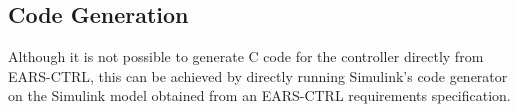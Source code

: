 \subsection{Code Generation}
\vspace{-.2cm}Although it is not possible to generate C code for the controller
directly from \textsf{EARS-CTRL}, this can be achieved by directly running Simulink's code
generator on the Simulink model obtained from an \textsf{EARS-CTRL} requirements
specification.\vspace{-.5cm}

